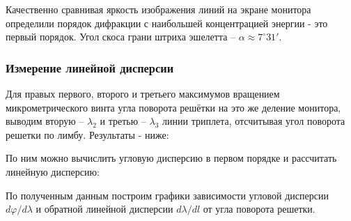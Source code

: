 \documentclass[12pt,a5paper,titlepage, main = russian]{article}
\begin{document}
Качественно сравнивая яркость изображения линий на экране монитора определили порядок дифракции с наибольшей концентрацией
энергии - это первый порядок. Угол скоса грани штриха эшелетта – $\alpha \approx 7^\circ 31'$.

\subsubsection{Измерение линейной дисперсии}
Для правых первого, второго и третьего максимумов вращением микрометрического винта угла поворота решётки на это же деление монитора, выводим вторую – $\lambda_2$ и третью – $\lambda_3$ линии триплета, отсчитывая угол поворота решетки по лимбу.
Результаты - ниже: \\

\begin{table}[H]
\centering
 \renewcommand{\arraystretch}{1.5}
\caption{Значения углов дифракции для линий триплета}
\end{table}

По ним можно вычислить угловую дисперсию в первом порядке и
рассчитать линейную дисперсию: \\
\begin{table}[H]
    \centering
    \renewcommand{\arraystretch}{1.5}
    \caption{Экспериментальные значения дисперсии для различных порядков спектра}
\end{table}
\newpage
По полученным данным построим графики зависимости угловой дисперсии $d\varphi/d\lambda$ и обратной линейной дисперсии $d\lambda/dl$ от угла поворота решетки. \\
\end{document}
